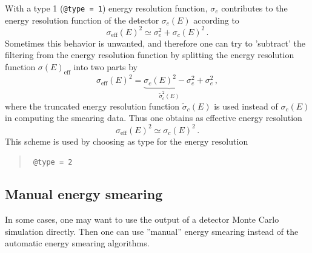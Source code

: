 With a type 1 ({\tt @type = 1}) energy resolution 
function, $\sigma_e$ contributes to the energy resolution function 
of the detector $\sigma_c(E)$ according to
\begin{equation}
\sigma_{\mathrm{eff}}(E)^2\simeq \sigma_e^2 + \sigma_c(E)^2\,.
\end{equation} 
Sometimes this behavior is unwanted, and therefore one can try to 
'subtract' the filtering from the energy resolution function by splitting 
the energy resolution function $\sigma(E)_{\mathrm{eff}}$ into
two parts by
\begin{equation}
\sigma_{\mathrm{eff}}(E)^2=\underbrace{\sigma_c(E)^2-\sigma_e^2}_
{\tilde\sigma^2_c(E)}+\sigma_e^2\,,
\end{equation}
where the truncated energy resolution function $\tilde\sigma_c(E)$ 
is used instead of $\sigma_c(E)$ in computing the
smearing data. Thus one obtains as effective energy resolution
\begin{equation}
\sigma_{\mathrm{eff}}(E)^2\simeq \sigma_c(E)^2\,.
\end{equation} 
This scheme is used by choosing as type for the energy resolution
\begin{quote}
{\tt
@type = 2
}
\end{quote}

\subsection{Manual energy smearing}

In some cases, one may want to use the output of a detector Monte Carlo simulation
directly. Then one can use ''manual'' energy smearing instead  of the
automatic energy smearing algorithms. 

